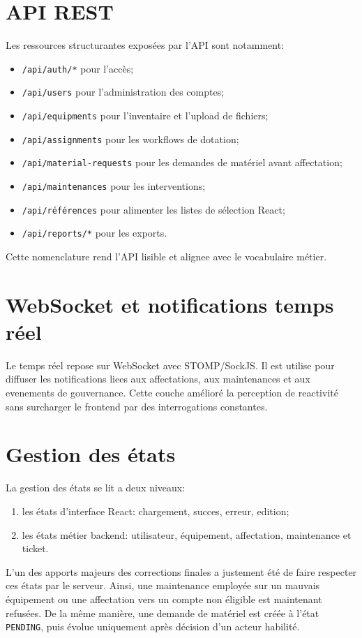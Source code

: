 ﻿\documentclass[12pt,a4paper,oneside]{report}
\begin{document}
\section{API REST}
Les ressources structurantes exposées par l'API sont notamment:
\begin{itemize}
  \item \texttt{/api/auth/*} pour l'accès;
  \item \texttt{/api/users} pour l'administration des comptes;
  \item \texttt{/api/equipments} pour l'inventaire et l'upload de fichiers;
  \item \texttt{/api/assignments} pour les workflows de dotation;
  \item \texttt{/api/material-requests} pour les demandes de matériel avant affectation;
  \item \texttt{/api/maintenances} pour les interventions;
  \item \texttt{/api/références} pour alimenter les listes de sélection React;
  \item \texttt{/api/reports/*} pour les exports.
\end{itemize}

Cette nomenclature rend l'API lisible et alignee avec le vocabulaire métier.

\section{WebSocket et notifications temps réel}
Le temps réel repose sur WebSocket avec STOMP/SockJS. Il est utilise pour diffuser les notifications liees aux affectations, aux maintenances et aux evenements de gouvernance. Cette couche amélioré la perception de reactivité sans surcharger le frontend par des interrogations constantes.

\section{Gestion des états}
La gestion des états se lit a deux niveaux:
\begin{enumerate}
  \item les états d'interface React: chargement, succes, erreur, edition;
  \item les états métier backend: utilisateur, équipement, affectation, maintenance et ticket.
\end{enumerate}

L'un des apports majeurs des corrections finales a justement été de faire respecter ces états par le serveur. Ainsi, une maintenance employée sur un mauvais équipement ou une affectation vers un compte non éligible est maintenant refusées. De la même manière, une demande de matériel est créée à l'état \texttt{PENDING}, puis évolue uniquement après décision d'un acteur habilité.
\end{document}
